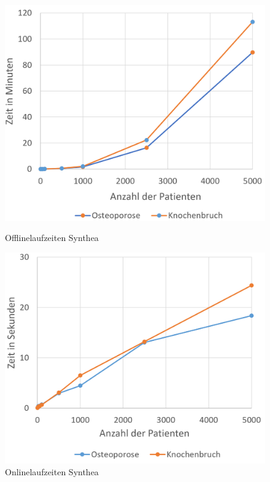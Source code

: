 \documentclass[german,version-2020-11]{uzl-thesis}
\begin{document}
	\begin{figure}[ht]
		\begin{minipage}{.5\textwidth}
		\centering
		\includegraphics[width=0.9\linewidth]{assets/OfflinezeitSynthea.png}
		\caption{Offlinelaufzeiten Synthea}
		\label{fig:syntheaoffline}
	\end{minipage}
	\begin{minipage}{.5\textwidth}
		\centering
		\includegraphics[width=0.9\linewidth]{assets/onlineSynthea.png}
		\caption{Onlinelaufzeiten Synthea}
		\label{fig:syntheaonline}
	\end{minipage}
\end{figure}
\noindent
\end{document}
